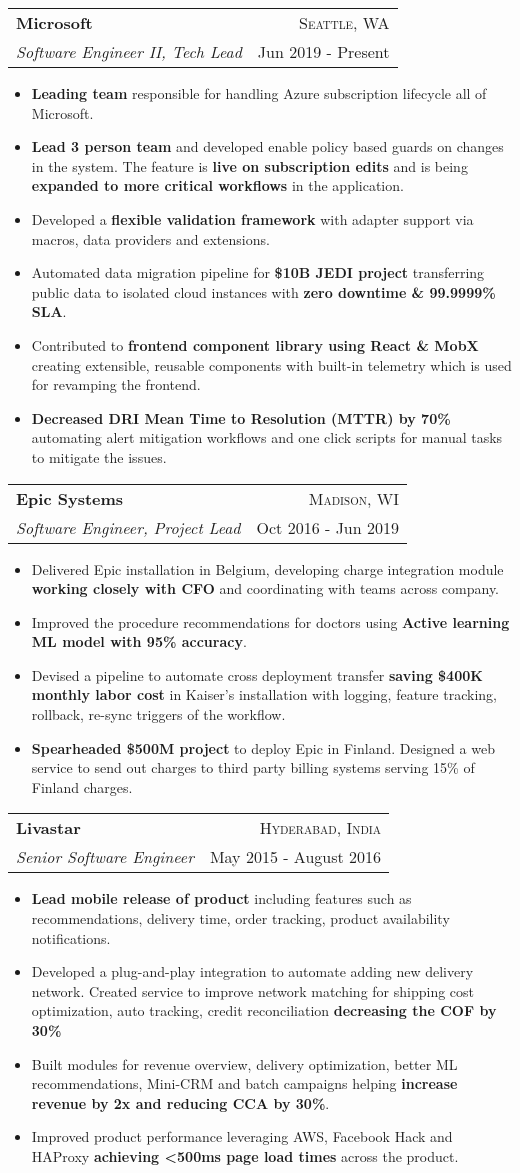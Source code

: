 \documentclass[letterpaper,11pt]{article}
\makeatletter
\newcommand{\resumeItem}[1]{
  \item\small{
    {#1 \vspace{-1pt}}
  }
}
\newcommand{\resumeSubheading}[4]{
  \vspace{-1pt}\item
    \begin{tabular*}{\textwidth}[t]{l@{\extracolsep{\fill}}r}
      \textbf{#1} & {\color{dark-grey}\textsc{#2}}\vspace{1pt}\\ %
      \textit{#3} & {\color{dark-grey} {#4}}\\ %
    \end{tabular*}\vspace{-4pt}
}
\newcommand{\resumeItemListStart}{\begin{itemize}}
\newcommand{\resumeItemListEnd}{\end{itemize}\vspace{0pt}}
\makeatother
\begin{document}
    \resumeSubheading
      {Microsoft}{Seattle, WA}
      {Software Engineer II, Tech Lead}{Jun 2019 - Present}
      \resumeItemListStart
        \resumeItem
          {\textbf{Leading team} responsible for handling Azure subscription lifecycle all of Microsoft.}
        \resumeItem
          {\textbf{Lead 3 person team} and developed enable policy based guards on changes in the system. The feature is \textbf{live on subscription edits} and is being \textbf{expanded to more critical workflows} in the application.}
        \resumeItem
          {Developed a \textbf{flexible validation framework} with adapter support via macros, data providers and extensions.}
        \resumeItem
          {Automated data migration pipeline for \textbf{\$10B JEDI project} transferring public data to isolated cloud instances with \textbf{zero downtime \& 99.9999\% SLA}.}
        \resumeItem
          {Contributed to \textbf{frontend component library using React \& MobX} creating extensible, reusable components with built-in telemetry which is used for revamping the frontend.}
        \resumeItem
          {\textbf{Decreased DRI Mean Time to Resolution (MTTR) by 70\%} automating alert mitigation workflows and one click scripts for manual tasks to mitigate the issues.}
        \resumeItemListEnd

    \resumeSubheading
      {Epic Systems}{Madison, WI}
      {Software Engineer, Project Lead}{Oct 2016 - Jun 2019}
      \resumeItemListStart
        \resumeItem
          {Delivered Epic installation in Belgium, developing charge integration module \textbf{working closely with CFO} and coordinating with teams across company.}
        \resumeItem
          {Improved the procedure recommendations for doctors using \textbf{Active learning ML model with 95\% accuracy}.}
        \resumeItem
          {Devised a pipeline to automate cross deployment transfer \textbf{saving \$400K monthly labor cost} in Kaiser’s installation with logging, feature tracking, rollback, re-sync triggers of the workflow.}
        \resumeItem
          {\textbf{Spearheaded \$500M project} to deploy Epic in Finland. Designed a web service to send out charges to third party billing systems serving 15\% of Finland charges.}
      \resumeItemListEnd

    \resumeSubheading
      {Livastar}{Hyderabad, India}
      {Senior Software Engineer}{May 2015 - August 2016}
      \resumeItemListStart
        \resumeItem
          {\textbf{Lead mobile release of product} including features such as recommendations, delivery time, order tracking, product availability notifications.}
      \resumeItem
          {Developed a plug-and-play integration to automate adding new delivery network. Created service to improve network matching for shipping cost optimization, auto tracking, credit reconciliation \textbf{decreasing the COF by 30\%}}
        \resumeItem
            {Built modules for revenue overview, delivery optimization, better ML recommendations, Mini-CRM and batch campaigns helping \textbf{increase revenue by 2x and reducing CCA by 30\%}.}
        \resumeItem
          {Improved product performance leveraging AWS, Facebook Hack and HAProxy \textbf{achieving <500ms page load times} across the product.}
      \resumeItemListEnd
\end{document}
